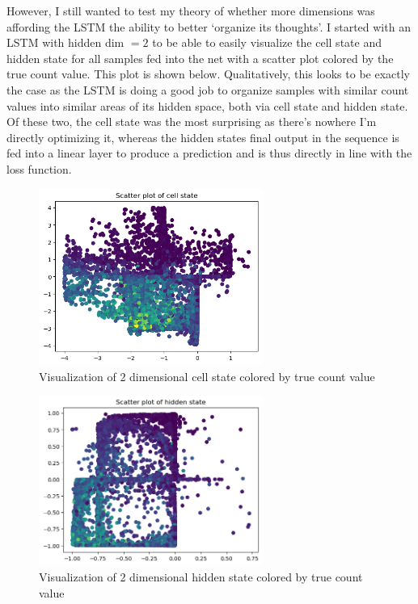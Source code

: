 \documentclass[12pt, twoside]{report}
\begin{document}
However, I still wanted to test my theory of whether more dimensions was affording the LSTM the ability
to better `organize its thoughts'.
I started with an LSTM with hidden dim $= 2$ to be able to easily visualize the cell state and hidden state 
for all samples fed into the net with a scatter plot colored by the true count value. This plot is shown below.
Qualitatively, this looks to be exactly the case as the LSTM is doing a good job to organize samples 
with similar count values into similar areas of its hidden space, both via cell state and hidden state.
Of these two, the cell state was the most surprising as there's nowhere I'm directly optimizing it, 
whereas the hidden states final output in the sequence is fed into a linear layer to produce a prediction and is
thus directly in line with the loss function.

\begin{figure}[H]
    \centering
    \includegraphics[width=0.65\textwidth]{figures/dim 2 cell state.png}
    \caption*{Visualization of 2 dimensional cell state colored by true count value}
\end{figure}

\begin{figure}[H]
    \centering
    \includegraphics[width=0.65\textwidth]{figures/dim 2 hidden state.png}
    \caption*{Visualization of 2 dimensional hidden state colored by true count value}
\end{figure}
\end{document}
